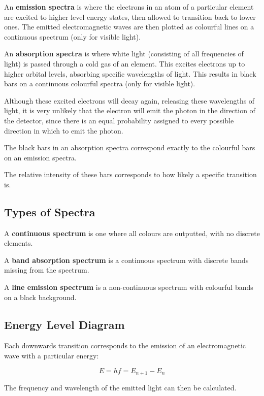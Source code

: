 \documentclass[a4paper,11pt]{report}
\begin{document}
An \textbf{emission spectra} is where the electrons in an atom of a particular
element are excited to higher level energy states, then allowed to transition
back to lower ones. The emitted electromagnetic waves are then plotted as
colourful lines on a continuous spectrum (only for visible light).

An \textbf{absorption spectra} is where white light (consisting of all
frequencies of light) is passed through a cold gas of an element. This excites
electrons up to higher orbital levels, absorbing specific wavelengths of light.
This results in black bars on a continuous colourful spectra (only for visible
light).

Although these excited electrons will decay again, releasing these wavelengths
of light, it is very unlikely that the electron will emit the photon in the
direction of the detector, since there is an equal probability assigned to
every possible direction in which to emit the photon.

The black bars in an absorption spectra correspond exactly to the colourful
bars on an emission spectra.

The relative intensity of these bars corresponds to how likely a specific
transition is.

\subsection{Types of Spectra}

A \textbf{continuous spectrum} is one where all colours are outputted, with
no discrete elements.

A \textbf{band absorption spectrum} is a continuous spectrum with discrete bands
missing from the spectrum.

A \textbf{line emission spectrum} is a non-continuous spectrum with colourful
bands on a black background.

\subsection{Energy Level Diagram}


Each downwards transition corresponds to the emission of an electromagnetic
wave with a particular energy:

$$
E = hf = E_{n + 1} - E_n
$$

The frequency and wavelength of the emitted light can then be calculated.
\end{document}
